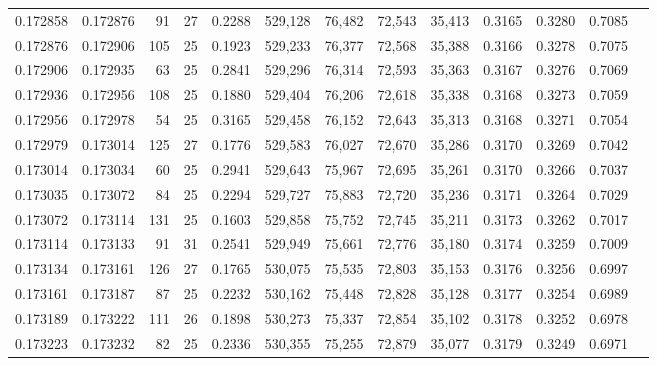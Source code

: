 \begin{tabular}{rrrrrrrrrrrrr}
0.172858 & 0.172876 &  91 &  27 &                                     0.2288 & 529,128 &  76,482 &  72,543 &  35,413 & 0.3165 & 0.3280 & 0.7085 \\
0.172876 & 0.172906 & 105 &  25 &                                     0.1923 & 529,233 &  76,377 &  72,568 &  35,388 & 0.3166 & 0.3278 & 0.7075 \\
0.172906 & 0.172935 &  63 &  25 &                                     0.2841 & 529,296 &  76,314 &  72,593 &  35,363 & 0.3167 & 0.3276 & 0.7069 \\
0.172936 & 0.172956 & 108 &  25 &                                     0.1880 & 529,404 &  76,206 &  72,618 &  35,338 & 0.3168 & 0.3273 & 0.7059 \\
0.172956 & 0.172978 &  54 &  25 &                                     0.3165 & 529,458 &  76,152 &  72,643 &  35,313 & 0.3168 & 0.3271 & 0.7054 \\
0.172979 & 0.173014 & 125 &  27 &                                     0.1776 & 529,583 &  76,027 &  72,670 &  35,286 & 0.3170 & 0.3269 & 0.7042 \\
0.173014 & 0.173034 &  60 &  25 &                                     0.2941 & 529,643 &  75,967 &  72,695 &  35,261 & 0.3170 & 0.3266 & 0.7037 \\
0.173035 & 0.173072 &  84 &  25 &                                     0.2294 & 529,727 &  75,883 &  72,720 &  35,236 & 0.3171 & 0.3264 & 0.7029 \\
0.173072 & 0.173114 & 131 &  25 &                                     0.1603 & 529,858 &  75,752 &  72,745 &  35,211 & 0.3173 & 0.3262 & 0.7017 \\
0.173114 & 0.173133 &  91 &  31 &                                     0.2541 & 529,949 &  75,661 &  72,776 &  35,180 & 0.3174 & 0.3259 & 0.7009 \\
0.173134 & 0.173161 & 126 &  27 &                                     0.1765 & 530,075 &  75,535 &  72,803 &  35,153 & 0.3176 & 0.3256 & 0.6997 \\
0.173161 & 0.173187 &  87 &  25 &                                     0.2232 & 530,162 &  75,448 &  72,828 &  35,128 & 0.3177 & 0.3254 & 0.6989 \\
0.173189 & 0.173222 & 111 &  26 &                                     0.1898 & 530,273 &  75,337 &  72,854 &  35,102 & 0.3178 & 0.3252 & 0.6978 \\
0.173223 & 0.173232 &  82 &  25 &                                     0.2336 & 530,355 &  75,255 &  72,879 &  35,077 & 0.3179 & 0.3249 & 0.6971 \\

\end{tabular}
